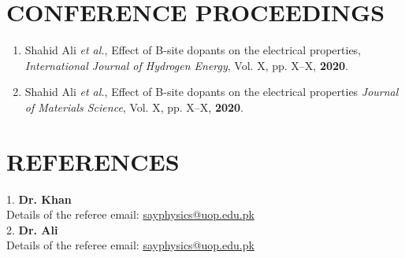 \documentclass[margin,line]{res}
\begin{document}
\begin{resume}
\section{CONFERENCE PROCEEDINGS}
\begin{enumerate}
\item Shahid Ali \textit{et al.}, Effect of B-site dopants on the electrical 
properties, \textit{International Journal of Hydrogen 
	Energy}, Vol. X, pp. X--X, \textbf{2020}.
\item Shahid Ali \textit{et al.}, Effect of B-site dopants on the electrical 
properties \textit{Journal of Materials Science}, Vol. X, pp. X--X, 
\textbf{2020}.
\end{enumerate}

\section{REFERENCES}
1. {\bf Dr. Khan}\\ 
Details of the referee email: \url {sayphysics@uop.edu.pk}
\\2. {\bf Dr. Ali}\\ 
Details of the referee email: \url {sayphysics@uop.edu.pk}\\

\end{resume}
\end{document}
